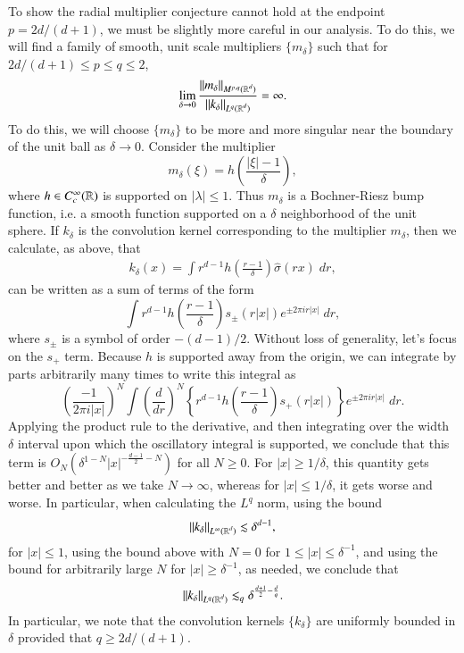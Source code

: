 To show the radial multiplier conjecture cannot hold at the endpoint $p = 2d/(d+1)$, we must be slightly more careful in our analysis. To do this, we will find a family of smooth, unit scale multipliers $\{ m_\delta \}$ such that for $2d/(d+1) \leq p \leq q \leq 2$,
%
\[ \lim_{\delta \to 0} \frac{\| m_\delta \|_{M^{p,q}(\operatorname{\mathbb{R}}^d)}}{\| k_\delta \|_{L^q(\operatorname{\mathbb{R}}^d)}} = \infty. \]
%
To do this, we will choose $\{ m_\delta \}$ to be more and more singular near the boundary of the unit ball as $\delta \to 0$. Consider the multiplier 
%
\[ m_\delta(\xi) = h \left( \frac{|\xi| - 1}{\delta} \right), \]
%
where $h \in C_c^\infty(\operatorname{\mathbb{R}})$ is supported on $|\lambda| \leq 1$. Thus $m_\delta$ is a Bochner-Riesz bump function, i.e. a smooth function supported on a $\delta$ neighborhood of the unit sphere. If $k_\delta$ is the convolution kernel corresponding to the multiplier $m_\delta$, then we calculate, as above, that
%
\begin{align*}
    k_\delta(x) = \int r^{d-1} h \left( \frac{r - 1}{\delta} \right) \widehat{\sigma}(rx)\; dr,
\end{align*}
%
can be written as a sum of terms of the form
%
\[ \int r^{d-1} h \left( \frac{r - 1}{\delta} \right) s_{\pm}(r|x|) e^{\pm 2 \pi i r |x|}\; dr, \]
%
where $s_{\pm}$ is a symbol of order $-(d-1)/2$. Without loss of generality, let's focus on the $s_+$ term. Because $h$ is supported away from the origin, we can integrate by parts arbitrarily many times to write this integral as
%
\[ \left( \frac{-1}{2 \pi i |x|} \right)^N \int \left( \frac{d}{dr} \right)^N \left\{ r^{d-1} h \left( \frac{r-1}{\delta} \right) s_+(r|x|) \right\} e^{\pm 2 \pi i r |x|}\; dr. \]
%
Applying the product rule to the derivative, and then integrating over the width $\delta$ interval upon which the oscillatory integral is supported, we conclude that this term is $O_N( \delta^{1 - N} |x|^{- \frac{d-1}{2} -N} )$ for all $N \geq 0$. For $|x| \geq 1/\delta$, this quantity gets better and better as we take $N \to \infty$, whereas for $|x| \leq 1/\delta$, it gets worse and worse. In particular, when calculating the $L^q$ norm, using the bound
%
\[ \| k_\delta \|_{L^\infty(\operatorname{\mathbb{R}}^d)} \lesssim \delta^{d-1}, \]
%
for $|x| \leq 1$, using the bound above with $N = 0$ for $1 \leq |x| \leq \delta^{-1}$, and using the bound for arbitrarily large $N$ for $|x| \geq \delta^{-1}$, as needed, we conclude that
%
\[ \| k_\delta \|_{L^q(\operatorname{\mathbb{R}}^d)} \lesssim_q \delta^{\frac{d+1}{2} - \frac{d}{q}}. \]
%
In particular, we note that the convolution kernels $\{ k_\delta \}$ are uniformly bounded in $\delta$ provided that $q \geq 2d/(d+1)$.
